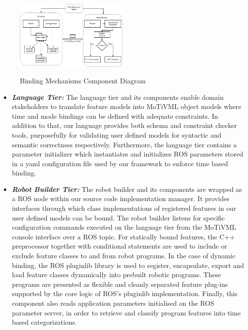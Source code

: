 \documentclass[conference]{IEEEtran}
\begin{document}
\begin{figure}[H]
	\caption{Binding Mechanisms Component Diagram}
	\centering
	\includegraphics[width=0.5\textwidth]{diagrams/mecha-compo.png}
	\label{mecha-compo}
\end{figure}

\begin{itemize}
	\item \textit{\textbf{Language Tier:}}
	The language tier and its components enable domain stakeholders to translate feature models into MoTiVML object models where time and mode bindings can be defined with adequate constraints. In addition to that, our language provides both schema and constraint checker tools, purposefully for validating user defined models for syntactic and semantic correctness respectively. Furthermore, the language tier contains a parameter initializer which instantiates and initializes ROS parameters stored in a yaml configuration file used by our framework to enforce time based binding.
	\item \textit{\textbf{Robot Builder Tier:}}
	The robot builder and its components are wrapped as a ROS node within our source code implementation manager. It provides interfaces through which class implementations of registered features in our user defined models can be bound. The robot builder listens for specific configuration commands executed on the language tier from the MoTiVML console interface over a ROS topic. For statically bound features, the C++ preprocessor together with conditional statements are used to include or exclude feature classes to and from robot programs.  In the case of dynamic binding, the ROS pluginlib library is used to register, encapsulate, export and load feature classes dynamically into prebuilt robotic programs. These programs are presented as flexible and cleanly separated feature plug-ins supported by the core logic of ROS's pluginlib implementation. Finally, this component also reads application parameters initialised on the ROS parameter server, in order to retrieve and classify program features into time based categorizations. 
\end{itemize}
\end{document}
